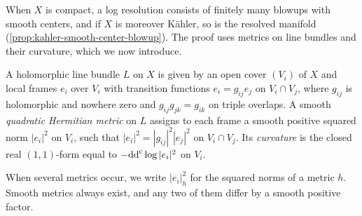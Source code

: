 When $X$ is compact, a log resolution consists of finitely many blowups with smooth centers, and if $X$ is moreover K\"ahler, so is the resolved manifold (\cref{prop:kahler-smooth-center-blowup}). The proof uses metrics on line bundles and their curvature, which we now introduce.

\begin{definition}\label{def:quadratic-line-bundle-metric}
A holomorphic line bundle $L$ on $X$ is given by an open cover $(V_i)$ of $X$ and local frames $e_i$ over $V_i$ with transition functions $e_i=g_{ij}e_j$ on $V_i\cap V_j$, where $g_{ij}$ is holomorphic and nowhere zero and $g_{ij}g_{jk}=g_{ik}$ on triple overlaps. A smooth \emph{quadratic Hermitian metric} on $L$ assigns to each frame a smooth positive squared norm $|e_i|^2$ on $V_i$, such that $|e_i|^2=|g_{ij}|^2|e_j|^2$ on $V_i\cap V_j$. Its \emph{curvature} is the closed real $(1,1)$-form equal to $-\mathrm{dd}^{\mathrm{c}}\log|e_i|^2$ on $V_i$.
\end{definition}

When several metrics occur, we write $|e_i|_h^2$ for the squared norms of a metric $h$. Smooth metrics always exist, and any two of them differ by a smooth positive factor.

